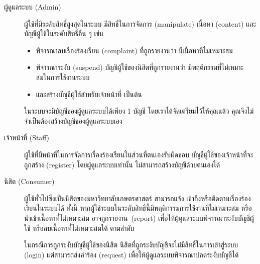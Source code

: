 \begin{description}
    \item[ผู้ดูแลระบบ (Admin)]
        \begin{minipage}[t]{\textwidth - \labelwidth - \labelsep}
        ผู้ใช้ที่มีระดับสิทธิ์สูงสุดในระบบ มีสิทธิ์ในการจัดการ (manipulate)
        เนื้อหา (content) และบัญชีผู้ใช้ในระดับสิทธิ์อื่น ๆ เช่น
            \begin{itemize}
                \item พิจารณาลบเรื่องร้องเรียน (complaint) ที่ถูกรายงานว่า
                    มีเนื้อหาที่\linebreak[3]ไม่เหมาะสม
                \item พิจารณาระงับ (suspend) บัญชีผู้ใช้ของนิสิตที่ถูกรายงานว่า
                    มีพฤติกรรมที่\linebreak[3]ไม่เหมาะสมในการใช้งานระบบ
                \item และสร้างบัญชีผู้ใช้สำหรับเจ้าหน้าที่ เป็นต้น
            \end{itemize}

        ในระบบจะมีบัญชีของผู้ดูแลระบบได้เพียง 1 บัญชี โดยเราได้จัดเตรียมไว้ให้คุณแล้ว คุณจึงไม่จำเป็นต้องสร้างบัญชีของผู้ดูแลระบบเอง
        \end{minipage}
    \item[เจ้าหน้าที่ (Staff)]
        \begin{minipage}[t]{\textwidth - \labelwidth - \labelsep}
        ผู้ใช้ที่มีหน้าที่ในการจัดการเรื่องร้องเรียนในส่วนที่ตนเองรับผิดชอบ บัญชีผู้ใช้ของเจ้าหน้าที่จะถูกสร้าง
        (register) โดยผู้ดูแลระบบเท่านั้น \mbox{ไม่สามารถสร้างบัญชี}ด้วยตนเองได้
        \end{minipage}
    \item[นิสิต (Consumer)]
        \begin{minipage}[t]{\textwidth - \labelwidth - \labelsep}
        ผู้ใช้ทั่วไปซึ่งเป็นนิสิตของมหาวิทยาลัยเกษตรศาสตร์ สามารถแจ้ง เข้าถึง\linebreak[3]
        หรือติดตามเรื่องร้องเรียนในระบบได้ ทั้งนี้ หากผู้ใช้ระบบในระดับสิทธิ์นี้มีพฤติกรรมการใช้งานที่ไม่เหมาะสม หรือนำเข้าเนื้อหาที่ไม่เหมาะสม
        \mbox{อาจถูกรายงาน (report)} เพื่อให้ผู้ดูแลระบบพิจารณาระงับบัญชีผู้ใช้ หรือลบเนื้อหาที่ไม่เหมาะสมได้ ตามลำดับ

        \vspace{1.5ex}

        ในกรณีการถูกระงับบัญชีผู้ใช้ของนิสิต นิสิตที่ถูกระงับบัญชีจะไม่มีสิทธิ์ในการเข้าสู่ระบบ (login)
        แต่สามารถส่งคำร้อง (request) เพื่อให้ผู้ดูแลระบบพิจารณาปลดระงับบัญชีได้
        \end{minipage}
\end{description}

